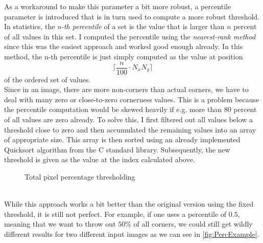  As a workaround to make this parameter a bit more robust, a percentile
parameter is introduced that is in turn used to compute a more robust threshold.\\
In statistics, the \textit{n-th percentile} of a set is the value that is larger than $n$ percent
of all values in this set.
I computed the percentile using the \textit{nearest-rank method} since this was the easiest
approach and worked good enough already. In this method, the n-th percentile is just simply
computed as the value at position 
\[
\lceil \frac{n}{100}\cdot N_xN_y\rceil
\] 
of the ordered set of values\cite{percentile}.\\
Since in an image, there are more non-corners than actual corners, we have to deal with many zero
or close-to-zero cornerness values. This is a problem because the percentile computation would be skewed
heavily if e.g. more than 80 percent of all values are zero already. To solve this, I first filtered
out all values below a threshold close to zero and then accumulated the remaining values into an
array of appropriate size. This array is then sorted using an already implemented Quicksort
algorithm from the C standard library. Subsequently, the new threshold is given as the value at
the index calculated above.
\begin{figure}[ht]
    
    \caption{Total pixel percentage thresholding}
\end{figure}\\
While this approach works a bit better than the original version using the fixed threshold, it is
still not perfect. For example, if one uses a percentile of $0.5$, meaning that we want to throw
out $50\%$ of all corners, we could still get wildly different results for two different input
images as we can see in \ref{fig:PercExample}.
